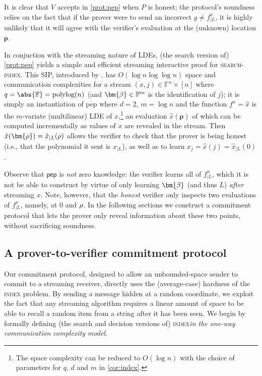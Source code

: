\documentclass[a4paper,UKenglish,cleveref, autoref, thm-restate]{lipics-v2021}
\theoremstyle{definition}
\newcommand{\field}{\mathbb{F}}
\newcommand{\polylog}{\operatorname{polylog}}
\newcommand{\indexproblem}{\normalfont\textsc{index}\xspace}
\newcommand{\searchindex}{\normalfont\textsc{search-index}\xspace}
\newcommand{\pepprotocol}{\textsf{pep}\xspace}
\newcommand{\dimension}{m}
\newcommand{\degree}{d}
\newcommand{\fieldsize}{q}
\newcommand{\evaluationpoint}{\bm{\fe2}}
\newcommand{\fingerprinttuple}{\bm{\rho}}
\renewcommand{\line}{L}
\def\fe#1{
    \ifnum#1=1
        \alpha
    \else
    \ifnum#1=2
        \beta
    \else
    \ifnum#1=3
        \gamma
    \fi\fi\fi
}
\def\rfe#1{
    \ifnum#1=1
        \rho
    \else
    \ifnum#1=2
        \sigma
    \else
    \fi\fi
}
\begin{document}
It is clear that $V$ accepts in \cref{prot:pep} when $P$ is honest; the protocol's soundness relies on the fact that if the prover were to send an incorrect $g \neq f^x_{|\line}$, it is highly unlikely that it will agree with the verifier's evaluation at the (unknown) location $\fingerprinttuple$.

In conjuction with the streaming nature of LDEs, (the search version of) \cref{prot:pep} yields a simple and efficient streaming interactive proof for \searchindex. This SIP, introduced by \cite{CCMTV19}, has $O(\log n \log\log n)$ space and communication complexities for a stream $(x, j) \in \field^n \times [n]$ where $\fieldsize = \abs{\field} = \polylog(n)$ (and $\evaluationpoint \in \field^\dimension$ is the identification of $j$); it is simply an instantiation of \pepprotocol where $\degree = 2$, $\dimension = \log n$ and the function $f^x = \hat x$ is the $\dimension$-variate (multilinear) LDE of $x$,\footnote{The space complexity can be reduced to $O(\log n)$ with the choice of parameters for $\fieldsize$, $\degree$ and $\dimension$ in \cref{cor:index}.} an evaluation $\hat x(\fingerprinttuple)$ of which can be computed incrementally as values of $x$ are revealed in the stream. Then $\hat x(\fingerprinttuple) = \hat x_{|\line}(\rfe1)$ allows the verifier to check that the prover is being honest (i.e., that the polynomial it sent is $\hat x_{|\line}$), as well as to learn $x_j = \hat x(j) = \hat x_{|\line}(0)$.

Observe that $\pepprotocol$ is \emph{not} zero knowledge: the verifier learns all of $f^x_{|\line}$, which it is not be able to construct by virtue of only learning $\evaluationpoint$ (and thus $\line$) \emph{after} streaming $x$. Note, however, that the \emph{honest} verifier only inspects two evaluations of $f^x_{|\line}$, namely, at $0$ and $\rfe1$. In the following sections we construct a commitment protocol that lets the prover only reveal information about these two points, without sacrificing soundness.

\subsection{A prover-to-verifier commitment protocol}
\label{sec:pv-commitment}

Our commitment protocol, designed to allow an unbounded-space sender to commit to a streaming receiver, directly uses the (average-case) hardness of the \indexproblem problem. By sending a message hidden at a random coordinate, we exploit the fact that any streaming algorithm requires a linear amount of space to be able to recall a random item from a string after it has been seen. We begin by formally defining (the search and decision versions of) \indexproblem \emph{in the one-way communication complexity model}.
\end{document}
